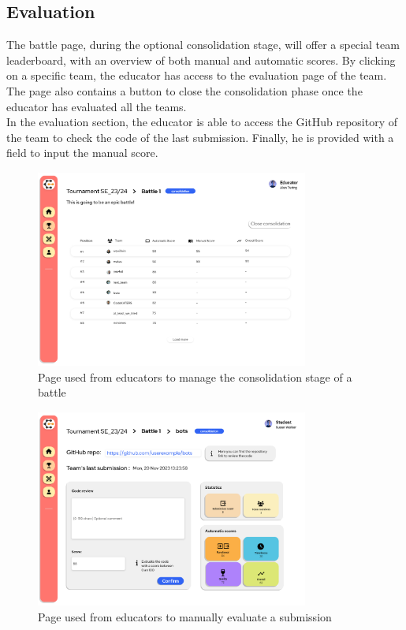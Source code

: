 \subsection{Evaluation}
The battle page, during the optional consolidation stage, will offer a special team leaderboard, with an overview of both manual and automatic scores. By clicking on a specific team, the educator has access to the evaluation page of the team. The page also contains a button to close the consolidation phase once the educator has evaluated all the teams.\\
In the evaluation section, the educator is able to access the GitHub repository of the team to check the code of the last submission. Finally, he is provided with a field to input the manual score.
\begin{figure}[H]
    \centering
    \includegraphics[width=0.8\textwidth]{Mockups/16_educator_battle_consolidation.png}
    \caption{Page used from educators to manage the consolidation stage of a battle}
\end{figure}
\begin{figure}[H]
    \centering
    \includegraphics[width=0.8\textwidth]{Mockups/17_educator_manual.png}
    \caption{Page used from educators to manually evaluate a submission}
\end{figure}